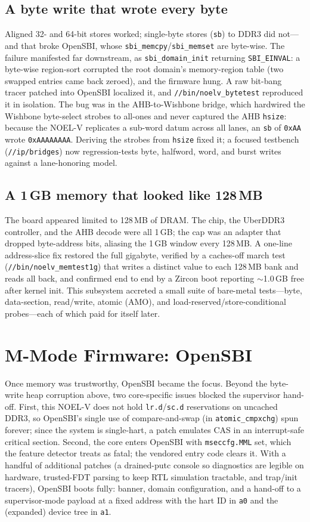 \documentclass[conference,nofonttune]{IEEEtran}
\newcommand{\code}[1]{\texttt{#1}}
\newcommand{\reg}[1]{\texttt{#1}}
\begin{document}
\subsection{A byte write that wrote every byte}
Aligned 32- and 64-bit stores worked; single-byte stores (\code{sb}) to DDR3 did
not---and that broke OpenSBI, whose \code{sbi\_memcpy}/\code{sbi\_memset} are
byte-wise. The failure manifested far downstream, as \code{sbi\_domain\_init}
returning \code{SBI\_EINVAL}: a byte-wise region-sort corrupted the root domain's
memory-region table (two swapped entries came back zeroed), and the firmware hung.
A raw bit-bang tracer patched into OpenSBI localized it, and \code{//bin/noelv\_bytetest}
reproduced it in isolation. The bug was in the AHB-to-Wishbone bridge, which
hardwired the Wishbone byte-select strobes to all-ones and never captured the AHB
\reg{hsize}: because the NOEL-V replicates a sub-word datum across all lanes, an
\code{sb} of \code{0xAA} wrote \code{0xAAAAAAAA}. Deriving the strobes from
\reg{hsize} fixed it; a focused testbench (\code{//ip/bridges}) now regression-tests
byte, halfword, word, and burst writes against a lane-honoring model.

\subsection{A 1\,GB memory that looked like 128\,MB}
The board appeared limited to 128\,MB of DRAM. The chip, the UberDDR3 controller,
and the AHB decode were all 1\,GB; the cap was an adapter that dropped byte-address
bits, aliasing the 1\,GB window every 128\,MB. A one-line address-slice fix
restored the full gigabyte, verified by a caches-off march test
(\code{//bin/noelv\_memtest1g}) that writes a distinct value to each 128\,MB bank
and reads all back, and confirmed end to end by a Zircon boot reporting
$\sim$1.0\,GB free after kernel init. This subsystem accreted a small suite of
bare-metal tests---byte, data-section, read/write, atomic (AMO), and
load-reserved/store-conditional probes---each of which paid for itself later.

\section{M-Mode Firmware: OpenSBI}
\label{sec:opensbi}

Once memory was trustworthy, OpenSBI became the focus. Beyond the byte-write heap
corruption above, two core-specific issues blocked the supervisor hand-off.
First, this NOEL-V does not hold \code{lr.d}/\code{sc.d} reservations on uncached
DDR3, so OpenSBI's single use of compare-and-swap (in
\code{atomic\_cmpxchg}) spun forever; since the system is single-hart, a patch
emulates CAS in an interrupt-safe critical section. Second, the core enters
OpenSBI with \reg{mseccfg.MML} set, which the feature detector treats as fatal;
the vendored entry code clears it. With a handful of additional patches (a
drained-putc console so diagnostics are legible on hardware, trusted-FDT parsing
to keep RTL simulation tractable, and trap/init tracers), OpenSBI boots fully:
banner, domain configuration, and a hand-off to a supervisor-mode payload at a
fixed address with the hart ID in \code{a0} and the (expanded) device tree in
\code{a1}.
\end{document}
